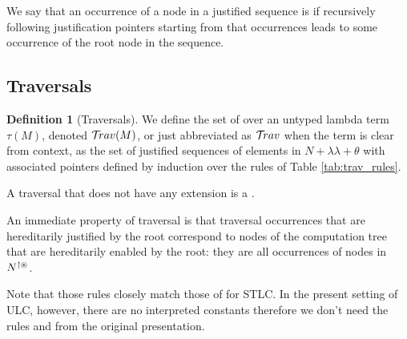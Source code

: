 \documentclass{article}
\theoremstyle{definition}
\newtheorem{definition}{Definition}[section]
\newcommand\Nodes{N}%
\newcommand{\ghostlmd}{{\lambda\!\!\lambda}}
\newcommand{\ghostvar}{\theta}
\newcommand{\NodeHjByRoot}{\Nodes^{\filter\theroot}}
\begin{document}
We say that an occurrence of a node in a justified sequence is  if recursively following justification pointers starting from that occurrences leads to some occurrence of the root node in the sequence.

\subsection{Traversals}

\begin{definition}[Traversals]
We define the set of  over an untyped lambda term $\tau(M)$, denoted $\mathcal{T}\!rav(M)$, or just abbreviated as $\mathcal{T}\!rav$ when the term is clear from context, as the set of justified sequences of elements in $\Nodes + \ghostlmd + \ghostvar$ with associated pointers defined by induction over the rules of Table \ref{tab:trav_rules}.

A traversal that does not have any extension is a .
\end{definition}

An immediate property of traversal is that traversal occurrences that are hereditarily justified by the root correspond to nodes of the computation tree that are hereditarily enabled by the root: \ie they are all occurrences of nodes in $\NodeHjByRoot$.

Note that those rules closely match those of \cite{BlumPhd} for STLC. In the present setting of ULC, however, there are no interpreted constants therefore we don't need the rules  and  from the original presentation.
\end{document}
